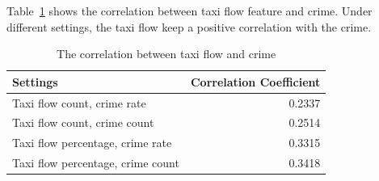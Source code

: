 {Table~\ref{tb:taxi} shows the correlation between taxi flow feature and crime. Under different settings, the taxi flow keep a positive correlation with the crime.


\begin{table}[h]
\caption{The correlation between taxi flow and crime}
\label{tb:taxi}
\begin{tabular}{|l|r|}
\hline
Settings & Correlation Coefficient \\\hline
Taxi flow count, crime rate & 0.2337 \\ \hline
Taxi flow count, crime count & 0.2514 \\ \hline
Taxi flow percentage, crime rate & 0.3315 \\ \hline
Taxi flow percentage, crime count & 0.3418 \\ \hline
\end{tabular}
\end{table}


}






